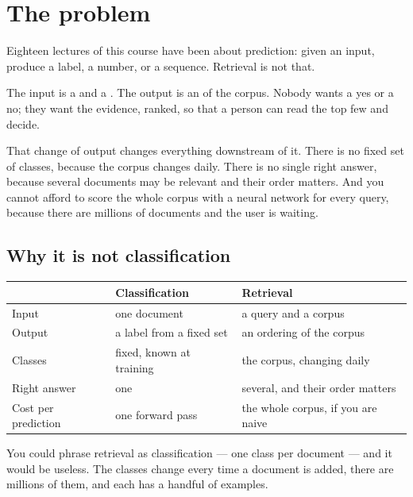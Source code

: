 \documentclass[11pt,a4paper]{article}
\begin{document}

\section{The problem}

Eighteen lectures of this course have been about prediction: given an input,
produce a label, a number, or a sequence. Retrieval is not that.

The input is a  and a . The output is an
 of the corpus. Nobody wants a yes or a no; they want the
evidence, ranked, so that a person can read the top few and decide.

That change of output changes everything downstream of it. There is no fixed
set of classes, because the corpus changes daily. There is no single right
answer, because several documents may be relevant and their order matters. And
you cannot afford to score the whole corpus with a neural network for every
query, because there are millions of documents and the user is waiting.

\subsection{Why it is not classification}

\begin{center}
\small
\begin{tabular}{lll}
\toprule
 & \textbf{Classification} & \textbf{Retrieval} \\
\midrule
Input             & one document              & a query and a corpus \\
Output            & a label from a fixed set  & an ordering of the corpus \\
Classes           & fixed, known at training  & the corpus, changing daily \\
Right answer      & one                       & several, and their order matters \\
Cost per prediction & one forward pass        & the whole corpus, if you are naive \\
\bottomrule
\end{tabular}
\end{center}

You could phrase retrieval as classification --- one class per document --- and
it would be useless. The classes change every time a document is added, there
are millions of them, and each has a handful of examples.
\end{document}
